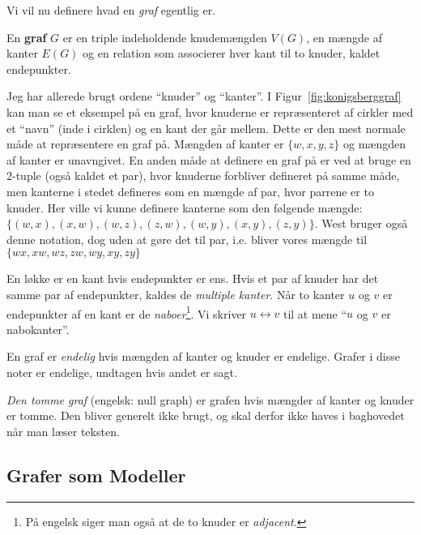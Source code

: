 Vi vil nu definere hvad en \textit{graf} egentlig er.

\begin{definition}[Graf]
En \textbf{graf} $G$ er en triple indeholdende knudemængden $V(G)$, en mængde af kanter $E(G)$ og en relation som associerer hver kant til to knuder, kaldet endepunkter.
\end{definition}

Jeg har allerede brugt ordene ``knuder'' og ``kanter''. I Figur~\ref{fig:konigsberggraf} kan man se et eksempel på en graf, hvor knuderne er repræsenteret af cirkler med et ``navn'' (inde i cirklen) og en kant der går mellem. Dette er den mest normale måde at repræsentere en graf på. Mængden af kanter er $\{w,x,y,z\}$ og mængden af kanter er unavngivet. En anden måde at definere en graf på er ved at bruge en 2-tuple (også kaldet et par), hvor knuderne forbliver defineret på samme måde, men kanterne i stedet defineres som en mængde af par, hvor parrene er to knuder. Her ville vi kunne definere kanterne som den følgende mængde: $\{(w,x), (x,w), (w,z), (z,w), (w,y), (x,y), (z,y)\}$. West bruger også denne notation, dog uden at gøre det til par, i.e. bliver vores mængde til $\{wx, xw, wz, zw, wy, xy, zy\}$

\begin{definition}[Løkke]
En løkke er en kant hvis endepunkter er ens. Hvis et par af knuder har det samme par af endepunkter, kaldes de \textit{multiple kanter}. Når to kanter $u$ og $v$ er endepunkter af en kant er de \textit{naboer}\footnote{På engelsk siger man også at de to knuder er \textit{adjacent}.}. Vi skriver $u \leftrightarrow v$ til at mene ``$u$ og $v$ er nabokanter''.
\end{definition}

En graf er \textit{endelig} hvis mængden af kanter og knuder er endelige. Grafer i disse noter er endelige, undtagen hvis andet er sagt.

\begin{remark}
\textit{Den tomme graf} (engelsk: null graph) er grafen hvis mængder af kanter og knuder er tomme. Den bliver generelt ikke brugt, og skal derfor ikke haves i baghovedet når man læser teksten.
\end{remark}

\subsection{Grafer som Modeller}%
\label{subsec:grafersommodeller}

